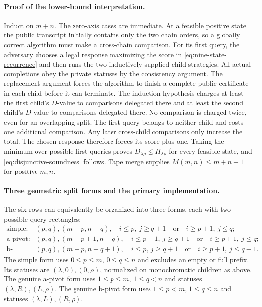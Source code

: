 \documentclass[11pt]{article}
\theoremstyle{definition}
\theoremstyle{remark}
\begin{document}
\paragraph{Proof of the lower-bound interpretation.}
Induct on $m+n$.  The zero-axis cases are immediate.  At a feasible
positive state the public transcript initially contains only the two
chain orders, so a globally correct algorithm must make a cross-chain
comparison.  For its first query, the adversary chooses a legal response
maximizing the score in \eqref{eq:nine-state-recurrence} and then runs the
two inductively supplied child strategies.  All actual completions obey
the private statuses by the consistency argument.  The replacement
argument forces the algorithm to finish a complete public certificate
in each child before it can terminate.  The induction hypothesis charges
at least the first child's $D$-value to comparisons delegated there and
at least the second child's $D$-value to comparisons delegated there.
No comparison is charged twice, even for an overlapping split.  The first
query belongs to neither child and costs one additional comparison.
Any later cross-child comparisons only increase the total.
The chosen response therefore forces its score plus one.  Taking the
minimum over possible first queries proves
$D_{\lambda\rho}\le H_{\lambda\rho}$ for every feasible state, and
\eqref{eq:disjunctive-soundness} follows.  Tape merge supplies
$M(m,n)\le m+n-1$ for positive $m,n$.

\paragraph{Three geometric split forms and the primary implementation.}
The six rows can equivalently be organized into three forms, each with
two possible query rectangles:
\begin{align*}
\text{simple: }& (p,q),(m-p,n-q),\quad
     i\le p,\ j\ge q+1\quad\text{or}\quad i\ge p+1,\ j\le q;\\
\text{a-pivot: }& (p,q),(m-p+1,n-q),\quad
     i\le p-1,\ j\ge q+1\quad\text{or}\quad i\ge p+1,\ j\le q;\\
\text{b-pivot: }& (p,q),(m-p,n-q+1),\quad
     i\le p,\ j\ge q+1\quad\text{or}\quad i\ge p+1,\ j\le q-1.
\end{align*}
The simple form uses $0\le p\le m$, $0\le q\le n$ and excludes an empty
or full prefix.  Its statuses are $(\lambda,0),(0,\rho)$, normalized on
monochromatic children as above.  The genuine a-pivot form uses
$1\le p\le m$, $1\le q<n$ and statuses
$(\lambda,R),(L,\rho)$.  The genuine b-pivot form uses
$1\le p<m$, $1\le q\le n$ and statuses
$(\lambda,L),(R,\rho)$.
\end{document}
